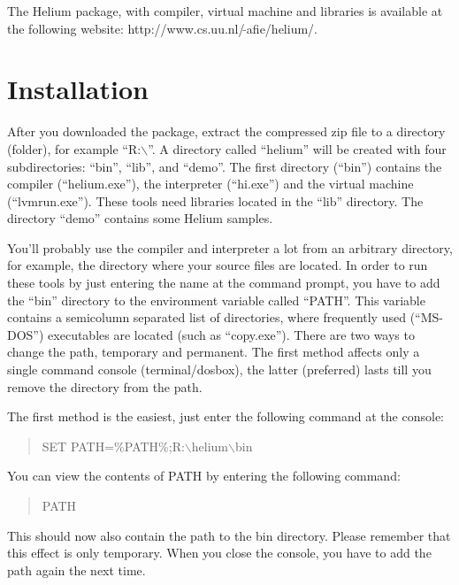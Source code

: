 \documentclass[pdftex,11pt,a4paper,notitlepage]{article}
\begin{document}
        The Helium package, with compiler, virtual machine and libraries is
        available at the following website:
        \mbox{http://www.cs.uu.nl/$\,\tilde{}$afie/helium/}.


    \section{Installation}
        
        After you downloaded the package, extract the compressed zip file to
        a directory (folder), for example ``R:$\backslash$''.
        A directory called ``helium'' will be created with four
        subdirectories: ``bin'', ``lib'',  and ``demo''. The first
        directory (``bin'') contains the compiler (``helium.exe''), 
        the interpreter (``hi.exe'') and the
        virtual machine (``lvmrun.exe''). These tools need libraries located
        in the ``lib'' directory. The directory ``demo'' contains some Helium
        samples.
        
        You'll probably use the compiler and interpreter a lot from an
        arbitrary directory, for example, the directory where your source
        files are located. In order to run these tools by just entering the
        name at the command prompt, you have to add the ``bin'' directory
        to the environment variable called ``PATH''. This variable contains
        a semicolumn separated list of directories, where frequently used
        (``MS-DOS'') executables are located (such as ``copy.exe''). There
        are two ways to change the path, temporary and permanent. The first
        method affects only a single command console (terminal/dosbox), the
        latter (preferred) lasts till you remove the directory from the path.
        
        The first method is the easiest, just enter the following command
        at the console:
        \begin{quote}
        SET PATH=\%PATH\%;R:$\backslash$helium$\backslash$bin
        \end{quote}
        You can view the contents of PATH by entering the following command:
        \begin{quote}
        PATH
        \end{quote}
        This should now also contain the path to the bin directory.
        Please remember that this effect is only temporary. When you close the
        console, you have to add the path again the next time.
        
\end{document}
